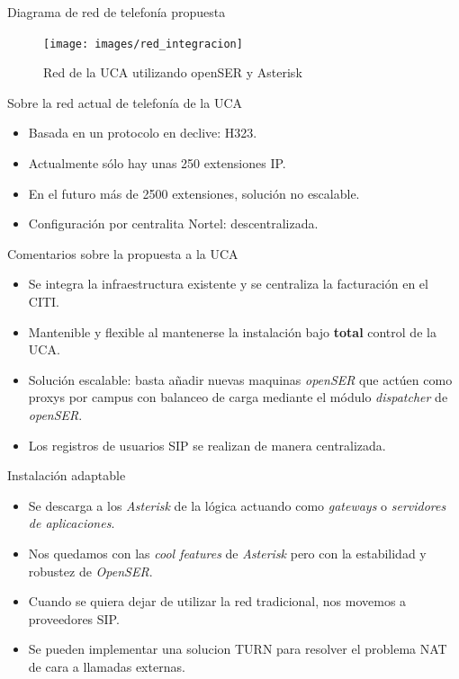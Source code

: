 \documentclass{beamer}
\begin{document}
\begin{frame}{Diagrama de red de telefonía propuesta}
  \begin{figure}
    \centering
    \texttt{[image: images/red\_integracion]}
    \caption{Red de la UCA utilizando openSER y Asterisk}
    \label{fig:uca-integrada}
  \end{figure}
\end{frame}

\begin{frame}
\begin{block}{Sobre la red actual de telefonía de la UCA}
  \begin{itemize}
  \item Basada en un protocolo en declive: H323.
  \item Actualmente sólo hay unas 250 extensiones IP.
  \item En el futuro más de 2500 extensiones, solución no escalable.
  \item Configuración por centralita Nortel: descentralizada.
  \end{itemize}
\end{block}
\end{frame}

\begin{frame}
  \begin{block}{Comentarios sobre la propuesta a la UCA}
    \begin{itemize} 
  \item Se integra la infraestructura existente y se centraliza la facturación en el CITI.
\item Mantenible y flexible al mantenerse la instalación bajo \textbf{total} control de la UCA.
\item Solución escalable: basta añadir nuevas maquinas \emph{openSER} que actúen como proxys por campus con balanceo de carga mediante el módulo \emph{dispatcher} de \emph{openSER}.
\item Los registros de usuarios SIP se realizan de manera centralizada.
\end{itemize}
\end{block}

\end{frame}
\begin{frame}
  \begin{block}{Instalación adaptable}
    
  

  \begin{itemize}
  \item Se descarga a los \emph{Asterisk} de la lógica actuando como \emph{gateways} o \emph{servidores de aplicaciones}.
  \item Nos quedamos con las \emph{cool features} de \emph{Asterisk} pero con la estabilidad y robustez de \emph{OpenSER}.
  \item Cuando se quiera dejar de utilizar la red tradicional, nos movemos a proveedores SIP.
  \item Se pueden implementar una solucion TURN para resolver el problema NAT de cara a llamadas externas.
  \end{itemize}
  \end{block}
\end{frame}
\end{document}
